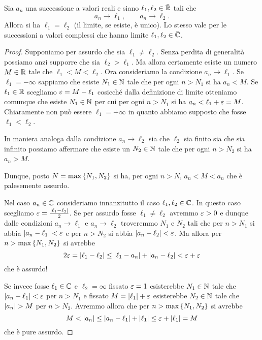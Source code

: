 \begin{theorem}
%
%
%
Sia $a_n$ una successione a valori reali e siano $\ell_1,\ell_2\in \bar {\mathbb R}$
tali che
\[
  a_n \to \ell_1, \qquad
  a_n \to \ell_2.
\]
Allora si ha $\ell_1=\ell_2$ (il limite, se esiste, è unico).
Lo stesso vale per le successioni a valori complessi che hanno limite
$\ell_1, \ell_2 \in \bar {\mathbb C}$.
\end{theorem}
%
\begin{proof}
Supponiamo per assurdo che sia $\ell_1\neq \ell_2$.
Senza perdita di generalità possiamo anzi supporre
che sia $\ell_2 > \ell_1$. Ma allora certamente
esiste un numero $M\in \mathbb R$ tale che $\ell_1 < M < \ell_2$.
Ora consideriamo la condizione $a_n\to \ell_1$.
Se $\ell_1=-\infty$ sappiamo che esiste $N_1\in\mathbb N$
tale che per ogni $n> N_1$ si ha $a_n < M$.
Se $\ell_1\in \mathbb R$ scegliamo $\varepsilon = M-\ell_1$
cosicché dalla definizione di limite otteniamo comunque
che esiste $N_1\in \mathbb N$ per cui per ogni $n>N_1$ si
ha $a_n < \ell_1+\varepsilon = M$. Chiaramente non può essere
$\ell_1=+\infty$ in quanto abbiamo supposto che fosse
$\ell_1 < \ell_2$.

In maniera analoga dalla condizione $a_n\to \ell_2$
sia che $\ell_2$ sia finito sia che sia infinito
possiamo affermare che esiste un $N_2\in \mathbb N$ tale
che per ogni $n>N_2$ si ha $a_n > M$.

Dunque, posto $N=\max{\left\{ N_1,N_2 \right\}}$ si ha,
per ogni $n>N$, $a_n < M < a_n$ che è palesemente assurdo.

Nel caso $a_n\in \mathbb C$ consideriamo innanzitutto
il caso $\ell_1,\ell_2 \in \mathbb C$. In questo
caso scegliamo $\varepsilon = \frac{{\left|\ell_1-\ell_2\right|}}{2}$.
Se per assurdo fosse $\ell_1\neq \ell_2$ avremmo $\varepsilon>0$
e dunque dalle condizioni $a_n\to \ell_1$
e $a_n \to \ell_2$ troveremmo $N_1$ e $N_2$
tali che per $n>N_1$ si abbia ${\left|a_n-\ell_1\right|}<\varepsilon$
e per $n>N_2$ si abbia ${\left|a_n -\ell_2\right|}<\varepsilon$. Ma allora
per $n>\max{\left\{ N_1,N_2 \right\}}$ si avrebbe
\[
  2\varepsilon
  = {\left|\ell_1-\ell_2\right|}
  \le {\left|\ell_1-a_n\right|} + {\left|a_n-\ell_2\right|}
  < \varepsilon + \varepsilon
\]
che è assurdo!

Se invece fosse $\ell_1\in \mathbb C$ e $\ell_2=\infty$
fissato $\varepsilon=1$ esisterebbe $N_1\in \mathbb N$
tale che ${\left|a_n-\ell_1\right|}<
\varepsilon$ per $n>N_1$ e fissato $M={\left|\ell_1\right|}+\varepsilon$
esisterebbe $N_2\in \mathbb N$ tale che ${\left|a_n\right|} > M$ per $n>N_2$.
Avremmo allora che per $n>\max{\left\{ N_1,N_2 \right\}}$ si avrebbe
\[
  M
  <{\left|a_n\right|}
  \le {\left|a_n-\ell_1\right|}+{\left|\ell_1\right|}
  \le \varepsilon + {\left|\ell_1\right|} = M
\]
che è pure assurdo.
\end{proof}


